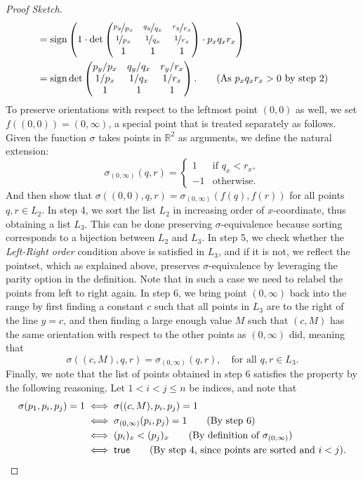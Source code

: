 \begin{proof}[Proof Sketch]
\begin{align*}
                        &= \operatorname{sign} \left(1 \cdot \det  \begin{pmatrix} \nicefrac{p_y}{p_x} & \nicefrac{q_y}{q_x} & \nicefrac{r_y}{r_x} \\ \nicefrac{1}{p_x} & \nicefrac{1}{q_x} & \nicefrac{1}{r_x} \\ 1 & 1 & 1 \end{pmatrix} \cdot  p_x q_x r_x  \right)\\ &= \operatorname{sign} \det \begin{pmatrix} p_y/p_x & q_y/q_x & r_y/r_x \\ 1/p_x & 1/q_x & 1/r_x \\ 1 & 1 & 1 \end{pmatrix}.\tag{As $p_x q_x r_x > 0$ by step 2}
\end{align*}
To preserve orientations with respect to the leftmost point $(0, 0)$ as well, we set $f( (0, 0)) = (0, \infty)$, a special point that is treated separately as follows. Given the function $\sigma$ takes points in $\mathbb{R}^2$ as arguments, we define the natural extension:
\[
  \sigma_{(0, \infty)}(q, r) = \begin{cases}
    1 & \text{if } q_x < r_x, \\
    -1 & \text{otherwise}.  
  \end{cases}
\] 
And then show that $\sigma((0, 0), q, r) = \sigma_{(0, \infty)}(f(q), f(r))$ for all points $q, r \in L_2$. 
In step 4, we sort the list $L_2$ in increasing order of $x$-coordinate, thus obtaining a list $L_3$. This can be done preserving $\sigma$-equivalence because sorting corresponds to a bijection between $L_2$ and $L_3$.
In step 5, we check whether the \emph{Left-Right order} condition above is satisfied in $L_3$, and if it is not, we reflect the pointset, which as explained above, preserves $\sigma$-equivalence by leveraging the parity option in the definition. Note that in such a case we need to relabel the points from left to right again. 
In step 6, we bring point $(0, \infty)$ back into the range by first finding a constant $c$ such that all points in $L_3$ are to the right of the line $y=c$, and then finding a large enough value $M$ such that $(c, M)$ has the same orientation with respect to the other points as $(0, \infty)$ did, meaning that 
\[
\sigma((c, M), q, r) = \sigma_{(0, \infty)}(q, r), \quad \text{for all } q, r \in L_3.
\] Finally, we note that the list of points obtained in step 6 satisfies the  property by the following reasoning. Let $1 < i < j \leq n$ be indices, and note that 
\begin{align*}
  \sigma(p_1, p_i, p_j) = 1 &\iff \sigma((c, M), p_i, p_j) = 1\\
                            &\iff \sigma_{(0, \infty)}(p_i, p_j) = 1\tag{By step 6}\\
                            &\iff (p_i)_x < (p_j)_x \tag{By definition of $\sigma_{(0, \infty)}$}\\
                            &\iff \textsf{true} \tag{By step 4, since points are sorted and $i < j$}.
\end{align*}
\end{proof}

